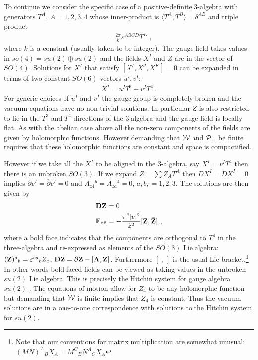 \documentclass[12pt]{article}
\newcommand{\nn}{\nonumber}
\numberwithin{equation}{section}
\begin{document}
To continue we consider the specific case of a positive-definite 3-algebra with generators $T^A$, $A=1,2,3,4$ whose inner-product  is $\langle T^A,T^B\rangle = \delta^{AB}$ and triple product 
\begin{align}
[T^A,T^B,T^C] = \frac{2\pi}{k}\varepsilon^{ABCD}T^D\ ,
\end{align}
where $k$ is a constant (usually taken to be integer).
The gauge field takes values in  $so(4) = su(2)\oplus su(2)$ and the fields $X^I$ and $Z$ are in the vector of $SO(4)$. Solutions for $X^I$ that satisfy $[X^I,X^J,X^K]=0$ can be expanded in terms of two constant $SO(6)$ vectors $u^I,v^I$: 
\begin{align}
X^I = u^I T^3+v^I T^4\ .
\end{align}
For generic choices of $u^I$ and $v^I$ the gauge group is completely broken and the vacuum equations have no non-trivial solutions. In particular $Z$ is also restricted to lie  in the $T^3$ and $T^4$ directions of the 3-algebra  and the gauge field is locally flat. As with the abelian case above all the non-zero components of the fields are given by holomorphic functions. However demanding that ${\cal W}$ and ${\cal P}_+$ be finite requires that these holomorphic functions are constant and space is compactified.

However if we take all the $X^I$ to be aligned in the 3-algebra, say $X^I = v^IT^4$  then there is an unbroken $SO(3)$. If we expand  $Z=\sum Z_AT^A$  then $DX^I=\bar DX^I=0$ implies $\partial v^I=\bar\partial v^I=0$ and 
$A_{z4}{}^b=A_{za}{}^4=0$, $a,b,=1,2,3$. The  solutions are then given by 
\begin{align}\label{Hitchin}
\bar {\bf D}{\bf Z} &=0\nn\\
 {\bf F}_{z \bar{z}} &=      -\frac{\pi^2|v|^2}{k^2 }[{\bf Z},\bar {\bf Z}]  \ ,
\end{align}
where a  bold face indicates that the components are orthogonal to $T^4$ in the three-algebra and re-expressed as elements of the $SO(3)$ Lie algebra: $({\bf Z})^a{}_b = \varepsilon^{ca}{}_b Z_c$, $  {\bf D}{\bf Z} = \partial {\bf Z} - [ {\bf A},{\bf Z}]$. Furthermore $[\ ,\ ]$ is the usual Lie-bracket.\footnote{Note that our conventions for matrix multiplication are somewhat unusual: $(MN)^A{}_BX_A = M^C{}_BN^{A}{}_CX_A$} In other words bold-faced fields can be viewed as taking values in the unbroken $su(2)$ Lie algebra. This is precisely the Hitchin system for gauge algebra $su(2)$ \cite{Hitchin:1986vp}.  The equations of motion allow for $Z_4$ to be any holomorphic function but demanding that ${\cal W}$ is  finite implies that $Z_4$ is constant. Thus the vacuum solutions are in a one-to-one correspondence with solutions to the Hitchin system for $su(2)$. 
\end{document}
